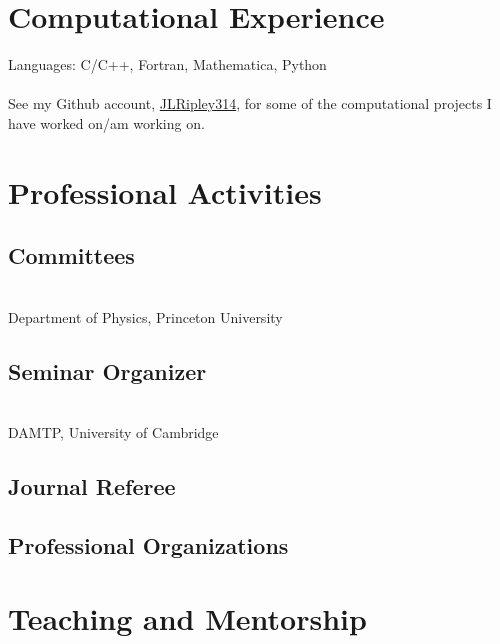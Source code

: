 \documentclass{my_cv}
\begin{document}
\section{Computational Experience}
   Languages: C/C++, Fortran, Mathematica, Python 
\\ \\
\indent
   See my Github account, \href{https://github.com/JLRipley314}{JLRipley314},
   for some of the computational projects I have worked on/am working on.
\section{Professional Activities}
\subsection{Committees}
   \\ \indent
   Department of Physics, Princeton University
\subsection{Seminar Organizer}
   \\ \indent
   DAMTP, University of Cambridge
\subsection{Journal Referee}
\subsection{Professional Organizations}
\section{Teaching and Mentorship}
\end{document}
